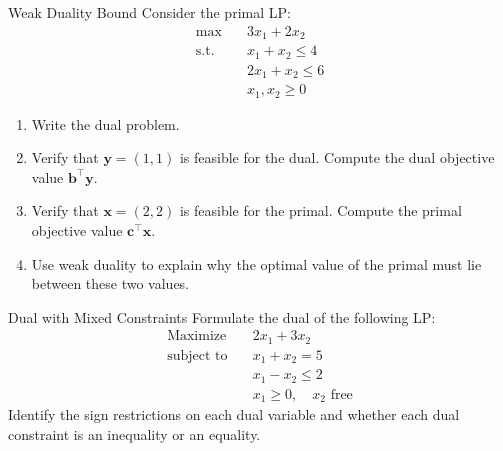 
\begin{ex}{Weak Duality Bound}{}
\label{ex:weak-duality-bound}
 Consider the primal LP:
\[
\begin{aligned}
\max \quad & 3x_1 + 2x_2 \\
\text{s.t.} \quad & x_1 + x_2 \leq 4 \\
& 2x_1 + x_2 \leq 6 \\
& x_1, x_2 \geq 0
\end{aligned}
\]
\begin{enumerate}
\item Write the dual problem.
\item Verify that $\mathbf{y} = (1, 1)$ is feasible for the dual. Compute the dual objective value $\mathbf{b}^\top \mathbf{y}$.
\item Verify that $\mathbf{x} = (2, 2)$ is feasible for the primal. Compute the primal objective value $\mathbf{c}^\top \mathbf{x}$.
\item Use weak duality to explain why the optimal value of the primal must lie between these two values.
\end{enumerate}
\end{ex}

\begin{ex}{Dual with Mixed Constraints}{}
 Formulate the dual of the following LP:
\[
\begin{aligned}
\text{Maximize} \quad & 2x_1 + 3x_2 \\
\text{subject to} \quad
& x_1 + x_2 = 5 \\
& x_1 - x_2 \leq 2 \\
& x_1 \geq 0, \quad x_2 \text{ free}
\end{aligned}
\]
Identify the sign restrictions on each dual variable and whether each dual constraint is an inequality or an equality.
\exrefs{\S\ref{sec:duality-forms}}
\end{ex}

